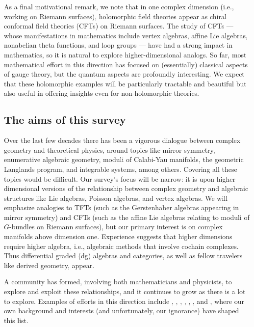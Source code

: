 \documentclass[11pt]{amsart}
\begin{document}
As a final motivational remark, we note that in one complex dimension (i.e., working on Riemann surfaces), 
holomorphic field theories appear as chiral conformal field theories (CFTs) on Riemann surfaces. 
The study of CFTs --- whose manifestations in mathematics include vertex algebras, affine Lie algebras, nonabelian theta functions, and loop groups --- have had a strong impact in mathematics,
so it is natural to explore higher-dimensional analogs.
So far, most mathematical effort in this direction has focused on (essentially) classical aspects of gauge theory,
but the quantum aspects are profoundly interesting.
We expect that these holomorphic examples will be particularly tractable and beautiful but also useful in offering insights even for non-holomorphic theories.

\subsection{The aims of this survey}

Over the last few decades there has been a vigorous dialogue between complex geometry and theoretical physics,
around topics like mirror symmetry, enumerative algebraic geometry, moduli of Calabi-Yau manifolds, the geometric Langlands program, and integrable systems, among others.
Covering all these topics would be difficult.
Our survey's focus will be narrow:
it is upon higher dimensional versions of the relationship between complex geometry and algebraic structures like Lie algebras, Poisson algebras, and vertex algebras.
We will emphasize analogies to TFTs (such as the Gerstenhaber algebras appearing in mirror symmetry) and CFTs (such as the affine Lie algebras relating to moduli of $G$-bundles on Riemann surfaces),
but our primary interest is on complex manifolds above dimension one.
Experience suggests that higher dimensions require higher algebra,
i.e., algebraic methods that involve cochain complexes.
Thus differential graded (dg) algebras and categories,
as well as fellow travelers like derived geometry, appear.

A community has formed, involving both mathematicians and physicists, to explore and exploit these relationships,
and it continues to grow as there is a lot to explore.
Examples of efforts in this direction include \cite{PTVV}, \cite{FHK,HenKap}, \cite{CLbcov, LiVertex}, \cite{CGholography,BGKWY}, \cite{CostelloPaquette}, \cite{BBBDN}, and \cite{AlfonsiYoungHC},
where our own background and interests (and unfortunately, our ignorance) have shaped this list.
\end{document}
